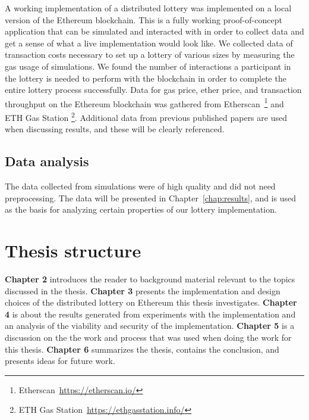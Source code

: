 A working implementation of a distributed lottery was implemented on a local version of the Ethereum blockchain. This is a fully working proof-of-concept application that can be simulated and interacted with in order to collect data and get a sense of what a live implementation would look like. 
We collected data of transaction costs necessary to set up a lottery of various sizes by measuring the gas usage of simulations. 
We found the number of interactions a participant in the lottery is needed to perform with the blockchain in order to complete the entire lottery process successfully. 
Data for gas price, ether price, and transaction throughput on the Ethereum blockchain was gathered from Etherscan~\footnote{Etherscan~\url{https://etherscan.io/}} and ETH Gas Station \footnote{ETH Gas Station~\url{https://ethgasstation.info/}}. 
Additional data from previous published papers are used when discussing results, and these will be clearly referenced.

\subsection{Data analysis}

The data collected from simulations were of high quality and did not need preprocessing. The data will be presented in Chapter~\ref{chap:results}, and is used as the basis for analyzing certain properties of our lottery implementation. 

\section{Thesis structure}

\textbf{Chapter 2} introduces the reader to background material relevant to the topics discussed in the thesis. \newline
\textbf{Chapter 3} presents the implementation and design choices of the distributed lottery on Ethereum this thesis investigates.
\newline
\textbf{Chapter 4} is about the results generated from experiments with the implementation and an analysis of the viability and security of the implementation.
\newline
\textbf{Chapter 5} is a discussion on the the work and process that was used when doing the work for this thesis.
\newline
\textbf{Chapter 6} summarizes the thesis, contains the conclusion, and presents ideas for future work. 
